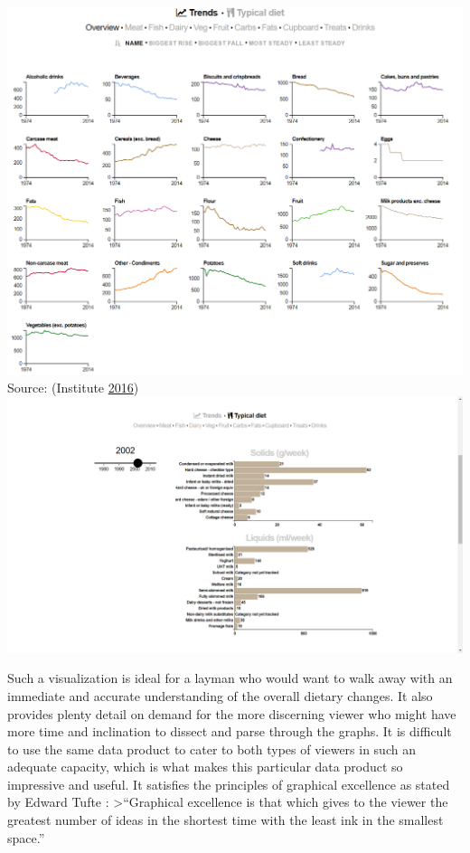 \documentclass[]{book}
\theoremstyle{definition}
\theoremstyle{definition}
\theoremstyle{definition}
\theoremstyle{remark}
\begin{document}
\includegraphics{images/britain-diet-data-trends.PNG} Source: (Institute
\protect\hyperlink{ref-britain_diet_2016}{2016})
\includegraphics{images/britain-diet-data-typical_diet.png}

Such a visualization is ideal for a layman who would want to walk away
with an immediate and accurate understanding of the overall dietary
changes. It also provides plenty detail on demand for the more
discerning viewer who might have more time and inclination to dissect
and parse through the graphs. It is difficult to use the same data
product to cater to both types of viewers in such an adequate capacity,
which is what makes this particular data product so impressive and
useful. It satisfies the principles of graphical excellence as stated by
Edward Tufte : \textgreater{}``Graphical excellence is that which gives
to the viewer the greatest number of ideas in the shortest time with the
least ink in the smallest space.''
\end{document}
